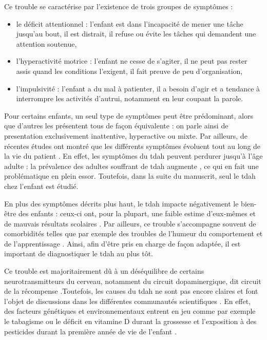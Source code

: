 Ce trouble se caractérise par l'existence de trois groupes de symptômes \citep{HAS} : 
\begin{itemize}
\item le déficit attentionnel : l'enfant est dans l'incapacité de mener une tâche jusqu'au bout, il est distrait, il refuse ou évite les tâches qui demandent
une attention soutenue,
\item l'hyperactivité motrice : l'enfant ne cesse de s'agiter, il ne peut pas rester assis quand les conditions l'exigent, il fait preuve de peu d'organisation,
\item l'impulsivité : l'enfant a du mal à patienter, il a besoin d'agir et a tendance à interrompre les activités d'autrui, notamment en leur coupant la parole.
\end{itemize}
Pour certains enfants, un seul type de symptômes peut être prédominant, alors que d'autres les présentent tous de façon équivalente \citep{DSM-5} : 
on parle ainsi de presentation exclusivement inattentive, hyperactive ou mixte. Par ailleurs, de récentes 
études ont montré que les différents symptômes évoluent tout au long de la vie du patient \citep{CFDCAP, Epstein2013}. En effet, les symptômes du \gls{tdah}
peuvent perdurer jusqu'à l'âge adulte \citep{Faraone2006} : la prévalence des adultes souffrant de \gls{tdah} augmente \citep{Chung2019, Weibel2019}, 
ce qui en fait une problématique en plein essor. Toutefois, dans la suite du manuscrit, seul le \gls{tdah} chez l'enfant est étudié. 

En plus des symptômes décrits plus haut, le \gls{tdah} impacte négativement le bien-être des enfants : ceux-ci ont, pour la plupart, une faible estime d'eux-mêmes 
\citep{Shaw2005} et de mauvais résultats scolaires \citep{Barry2002}. Par ailleurs, ce trouble s'accompagne souvent de comorbidités telles que par exemple 
des troubles de l'humeur du comportement et de l'apprentissage \citep{Monastra2005}. Ainsi, afin d'être pris en charge de façon adaptée, il est 
important de diagnostiquer le \gls{tdah} au plus tôt. 

Ce trouble est majoritairement dû à un déséquilibre de certains neurotransmitteurs du cerveau, notamment du circuit dopaminergique, 
dit circuit de la récompense \citep{Daley2010, Punja2016}.Toutefois, les causes du \gls{tdah} ne sont pas encore claires et font l'objet de discussions
dans les différentes communautés scientifiques \citep{Galera2014}. En effet, des facteurs génétiques et environnementaux entrent en jeu comme par exemple le tabagisme ou le déficit en
vitamine D durant la grossesse et l'exposition à des pesticides durant la première année de vie de l'enfant \citep{Galera2014, Sucksdorff2019}.

